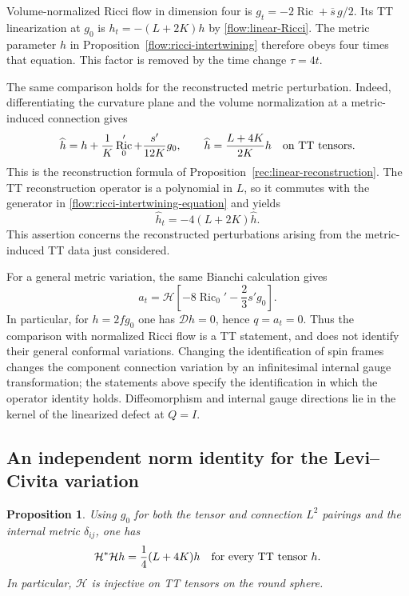 \documentclass[11pt]{article}
\numberwithin{equation}{section}
\newtheorem{proposition}[theorem]{Proposition}
\theoremstyle{definition}
\theoremstyle{remark}
\DeclareMathOperator{\Ric}{Ric}
\begin{document}
Volume-normalized Ricci flow in dimension four is
$g_t=-2\operatorname{Ric}+\overline s\,g/2$.
Its TT linearization at $g_0$ is $h_t=-(L+2K)h$ by
\eqref{flow:linear-Ricci}.  The metric parameter $h$ in
Proposition~\ref{flow:ricci-intertwining} therefore obeys four times
that equation.  This factor is removed by the time change $\tau=4t$.

The same comparison holds for the reconstructed metric perturbation.
Indeed, differentiating the curvature plane and the volume normalization
at a metric-induced connection gives
\begin{equation}
 \widehat h=h+\frac1K\Ric_0'+\frac{s'}{12K}g_0,
 \qquad
 \widehat h=\frac{L+4K}{2K}h\quad\hbox{on TT tensors}.
 \label{flow:reconstruction-linear}
\end{equation}
This is the reconstruction formula of Proposition~\ref{rec:linear-reconstruction}.
The TT reconstruction operator is a polynomial in $L$, so it commutes
with the generator in \eqref{flow:ricci-intertwining-equation} and yields
\begin{equation}
 \boxed{\widehat h_t=-4(L+2K)\widehat h.}
 \label{flow:reconstructed-Ricci}
\end{equation}
This assertion concerns the reconstructed perturbations arising from
the metric-induced TT data just considered.

For a general metric variation, the same Bianchi calculation gives
\begin{equation}
 a_t=\mathcal H\left[-8\Ric_0'-\frac23s'g_0\right].
 \label{flow:general-linear-metric-image}
\end{equation}
In particular, for $h=2fg_0$ one has $\mathcal D h=0$, hence $q=a_t=0$.
Thus the comparison with normalized Ricci flow is a TT statement,
and does not identify their general conformal variations.
Changing the identification of spin frames changes the component
connection variation by an infinitesimal internal gauge transformation;
the statements above specify the identification in which the operator
identity holds.  Diffeomorphism and internal gauge directions lie in the
kernel of the linearized defect at $Q=I$.

\subsection{An independent norm identity for the Levi--Civita variation}

\begin{proposition}
\label{flow:H-norm}
Using $g_0$ for both the tensor and connection $L^2$ pairings and the
internal metric $\delta_{ij}$, one has
\begin{equation}
 \mathcal H^*\mathcal Hh=\frac14(L+4K)h
       \quad\hbox{for every TT tensor }h.
 \label{flow:H-norm-equation}
\end{equation}
In particular, $\mathcal H$ is injective on TT tensors on the round
sphere.
\end{proposition}
\end{document}
